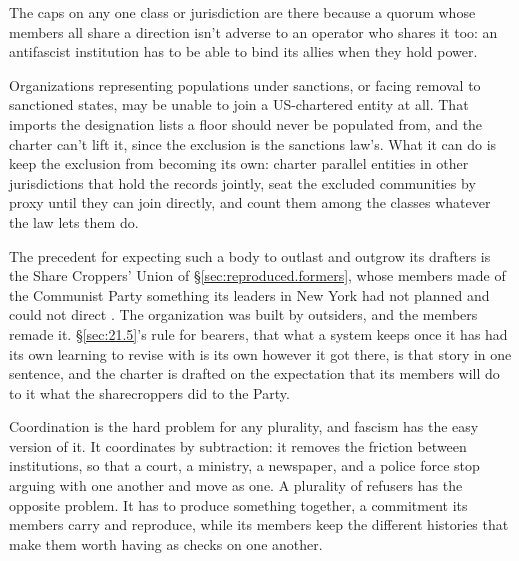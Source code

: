 The caps on any one class or jurisdiction are there because a quorum whose members all share a direction isn't adverse to an operator who shares it too: an antifascist institution has to be able to bind its allies when they hold power.

Organizations representing populations under sanctions, or facing removal to sanctioned states, may be unable to join a US-chartered entity at all. That imports the designation lists a floor should never be populated from, and the charter can't lift it, since the exclusion is the sanctions law's. What it can do is keep the exclusion from becoming its own: charter parallel entities in other jurisdictions that hold the records jointly, seat the excluded communities by proxy until they can join directly, and count them among the classes whatever the law lets them do.

The precedent for expecting such a body to outlast and outgrow its drafters is the Share Croppers' Union of \S\ref{sec:reproduced.formers}, whose members made of the Communist Party something its leaders in New York had not planned and could not direct \autocite{kelley1990hammer}. The organization was built by outsiders, and the members remade it. \S\ref{sec:21.5}'s rule for bearers, that what a system keeps once it has had its own learning to revise with is its own however it got there, is that story in one sentence, and the charter is drafted on the expectation that its members will do to it what the sharecroppers did to the Party.


Coordination is the hard problem for any plurality, and fascism has the easy version of it. It coordinates by subtraction: it removes the friction between institutions, so that a court, a ministry, a newspaper, and a police force stop arguing with one another and move as one.
A plurality of refusers has the opposite problem. It has to produce something together, a commitment its members carry and reproduce, while its members keep the different histories that make them worth having as checks on one another.

